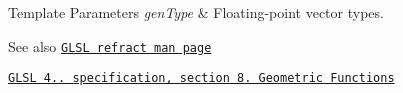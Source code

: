 \begin{DoxyTemplParams}{Template Parameters}
{\em gen\+Type} & Floating-\/point vector types.\\
\hline
\end{DoxyTemplParams}
\begin{DoxySeeAlso}{See also}
\href{http://www.opengl.org/sdk/docs/manglsl/xhtml/refract.xml}{\tt G\+L\+SL refract man page} 

\href{http://www.opengl.org/registry/doc/GLSLangSpec.4.20.8.pdf}{\tt G\+L\+SL 4.. specification, section 8. Geometric Functions} 
\end{DoxySeeAlso}
